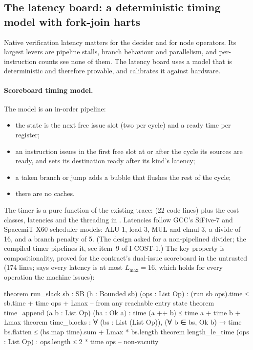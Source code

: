 \subsection{The latency board: a deterministic timing model with fork-join harts}\label{subsec:cost-lat}

Native verification latency matters for the decider and for node operators. Its largest levers are
pipeline stalls, branch behaviour and parallelism, and per-instruction counts see none of them. The
latency board uses a model that is deterministic and therefore provable, and calibrates it against
hardware.

\paragraph{Scoreboard timing model.} The model is an in-order pipeline:
\begin{itemize}[nosep]
\item the state  is the next free issue slot (two per cycle) and a ready time per register;
\item an instruction issues in the first free slot at or after the cycle its sources are ready, and
  sets its destination ready after its kind's latency;
\item a taken branch or jump adds a bubble that flushes the rest of the cycle;
\item there are no caches.
\end{itemize}
The timer is a pure function of the existing trace:  (22 code lines) plus the cost
classes, latencies and the  threading in . Latencies follow GCC's
SiFive-7 and SpacemiT-X60 scheduler models: ALU 1, load 3, MUL and clmul 3, a divide of 16, and a
branch penalty of 5. (The design asked for a non-pipelined divider; the compiled timer pipelines it,
see item~9 of I-COST-1.) The key property is compositionality, proved for the contract's dual-issue
scoreboard in the untrusted  (174 lines;  says every latency
is at most $L_{\max}=16$, which holds for every operation the machine issues):
\begin{leancode}[label={\footnotesize Library/Timer.lean (statements)}]
theorem run_slack {sb : SB} (h : Bounded sb) (ops : List Op) :
    (run sb ops).time ≤ sb.time + time ops + Lmax       -- from any reachable entry state
theorem time_append (a b : List Op) (ha : Ok a) : time (a ++ b) ≤ time a + time b + Lmax
theorem time_blocks : ∀ (bs : List (List Op)), (∀ b ∈ bs, Ok b) →
    time bs.flatten ≤ (bs.map time).sum + Lmax * bs.length
theorem length_le_time (ops : List Op) : ops.length ≤ 2 * time ops   -- non-vacuity
\end{leancode}
